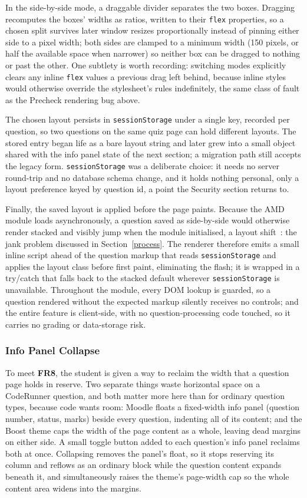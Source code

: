 In the side-by-side mode, a draggable divider separates the two boxes. Dragging recomputes the boxes' widths as ratios, written to their \texttt{flex} properties, so a chosen split survives later window resizes proportionally instead of pinning either side to a pixel width; both sides are clamped to a minimum width (150 pixels, or half the available space when narrower) so neither box can be dragged to nothing or past the other. One subtlety is worth recording: switching modes explicitly clears any inline \texttt{flex} values a previous drag left behind, because inline styles would otherwise override the stylesheet's rules indefinitely, the same class of fault as the Precheck rendering bug above.

The chosen layout persists in \texttt{sessionStorage} under a single key, recorded per question, so two questions on the same quiz page can hold different layouts. The stored entry began life as a bare layout string and later grew into a small object shared with the info panel state of the next section; a migration path still accepts the legacy form. \texttt{sessionStorage} was a deliberate choice: it needs no server round-trip and no database schema change, and it holds nothing personal, only a layout preference keyed by question id, a point the Security section returns to.

Finally, the saved layout is applied before the page paints. Because the AMD module loads asynchronously, a question saved as side-by-side would otherwise render stacked and visibly jump when the module initialised, a layout shift~\cite{webdevcls}: the jank problem discussed in Section~\ref{process}. The renderer therefore emits a small inline script ahead of the question markup that reads \texttt{sessionStorage} and applies the layout class before first paint, eliminating the flash; it is wrapped in a try/catch that falls back to the stacked default wherever \texttt{sessionStorage} is unavailable. Throughout the module, every DOM lookup is guarded, so a question rendered without the expected markup silently receives no controls; and the entire feature is client-side, with no question-processing code touched, so it carries no grading or data-storage risk.

\subsubsection{Info Panel Collapse}
To meet \textbf{FR8}, the student is given a way to reclaim the width that a question page holds in reserve. Two separate things waste horizontal space on a CodeRunner question, and both matter more here than for ordinary question types, because code wants room: Moodle floats a fixed-width info panel (question number, status, marks) beside every question, indenting all of its content; and the Boost theme caps the width of the page content as a whole, leaving dead margins on either side. A small toggle button added to each question's info panel reclaims both at once. Collapsing removes the panel's float, so it stops reserving its column and reflows as an ordinary block while the question content expands beneath it, and simultaneously raises the theme's page-width cap so the whole content area widens into the margins.


